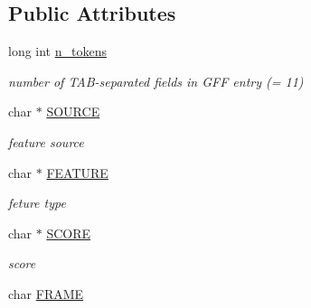 \subsection*{Public Attributes}
\begin{CompactItemize}
\item 
\hypertarget{classGenomicRegionGFF_aec963f555e7e807fb5046566622f5ee}{
long int \hyperlink{classGenomicRegionGFF_aec963f555e7e807fb5046566622f5ee}{n\_\-tokens}}
\label{classGenomicRegionGFF_aec963f555e7e807fb5046566622f5ee}

\begin{CompactList}\small\item\em number of TAB-separated fields in GFF entry (= 11) \item\end{CompactList}\item 
\hypertarget{classGenomicRegionGFF_2f0d4a5f15d8a756233436af03341734}{
char $\ast$ \hyperlink{classGenomicRegionGFF_2f0d4a5f15d8a756233436af03341734}{SOURCE}}
\label{classGenomicRegionGFF_2f0d4a5f15d8a756233436af03341734}

\begin{CompactList}\small\item\em feature source \item\end{CompactList}\item 
\hypertarget{classGenomicRegionGFF_0de447fbfad3da5b7a9cf07a5a6980f0}{
char $\ast$ \hyperlink{classGenomicRegionGFF_0de447fbfad3da5b7a9cf07a5a6980f0}{FEATURE}}
\label{classGenomicRegionGFF_0de447fbfad3da5b7a9cf07a5a6980f0}

\begin{CompactList}\small\item\em feture type \item\end{CompactList}\item 
\hypertarget{classGenomicRegionGFF_0e92da1f0fd153504e0630f27229ba4d}{
char $\ast$ \hyperlink{classGenomicRegionGFF_0e92da1f0fd153504e0630f27229ba4d}{SCORE}}
\label{classGenomicRegionGFF_0e92da1f0fd153504e0630f27229ba4d}

\begin{CompactList}\small\item\em score \item\end{CompactList}\item 
\hypertarget{classGenomicRegionGFF_42122a69eec385e0106e3861cb3b98f3}{
char \hyperlink{classGenomicRegionGFF_42122a69eec385e0106e3861cb3b98f3}{FRAME}}
\label{classGenomicRegionGFF_42122a69eec385e0106e3861cb3b98f3}


\end{CompactItemize}
